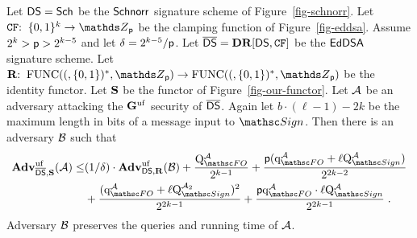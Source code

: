 \begin{theorem}\label{th-eddsa-1} Let $\mathsf{DS}=\mathsf{Sch}$ be the $\mathsf{Schnorr}$ signature scheme of Figure~\ref{fig-schnorr}. Let $\CFEDSA\Colon\allowbreak\bits^k\allowbreak\to\allowbreak\Z_{\Prime}$ be the clamping function of Figure~\ref{fig-eddsa}. Assume $2^{k} > \mathsf{p} > 2^{k-5}$ and let $\delta = 2^{k-5}/\mathsf{p}$. Let $\overline{\mathsf{DS}} = \mathbf{DR}[\mathsf{DS},\mathtt{CF}]$ be the $\mathsf{EdDSA}$ signature scheme. 
Let $\construct{R}\Colon\AllFuncs(\bits^*,\Z_{\Prime})\to \AllFuncs(\bits^*,\Z_{\Prime})$ be the identity functor.  
Let $\mathbf{S}$ be the functor of Figure~\ref{fig-our-functor}. Let $\mathcal{A}$ be an adversary attacking the $\mathbf{G}^{\mathrm{uf}}$ security of $\overline{\mathsf{DS}}$. Again let $ b \cdot (\ell-1) - 2k$ be the maximum length in bits of a message input to $\SignO$. Then there is an adversary $\mathcal{B}$ such that
\begin{align*}
	\ufAdv{\fDS,\ourF}{\advA} \leq & 
	 (1/\delta)\cdot\ufAdv{\DS,\construct{R}}{\advB} 
	+ \frac{ %
	\Queries{\HASH}{\advA}}{2^{k-1}}
	+ \frac{\Prime (\QueriesD{\HASH}{\advA}+ \ell \Queries{\SignO}{\advA})}{2^{2k-2}}\\
	& + \frac{(\QueriesD{\HASH}{\advA} + \ell \Queries{\SignO}{\advA_2})^2}{2^{2k-1}}
	+ \frac{\Prime\QueriesD{\HASH}{\advA} \cdot \ell\Queries{\SignO}{\advA}}{2^{2k-1}} 
	\;.
\end{align*}
Adversary $\mathcal{B}$ preserves the queries and running time of $\mathcal{A}$. 
\end{theorem}
